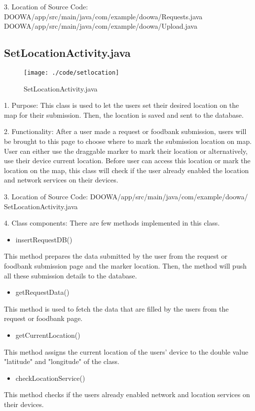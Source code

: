 \documentclass[conference]{IEEEtran}
\begin{document}
3. Location of Source Code: DOOWA/app/src/main/java/com/example/doowa/Requests.java\\
 DOOWA/app/src/main/java/com/example/doowa/Upload.java
\break
\break
\subsection{SetLocationActivity.java}
\begin{figure}[h!]
\texttt{[image: ./code/setlocation]}
\centering
\caption{SetLocationActivity.java}
\end{figure}
1. Purpose: This class is used to let the users set their desired location on the map for their submission. Then, the location is saved and sent to the database.\break
\par 2. Functionality: After a user made a request or foodbank submission, users will be brought to this page to choose where to mark the submission location on map. User can either use the draggable marker to mark their location or alternatively, use their device current location. Before user can access this location or mark the location on the map, this class will check if the user already enabled the location and network services on their devices. \break

3. Location of Source Code: DOOWA/app/src/main/java/com/example/doowa/ SetLocationActivity.java\break

4. Class components: There are few methods implemented in this class.
\begin{itemize}
\item insertRequestDB()
\end{itemize}
This method prepares the data submitted by the user from the request or foodbank submission page and the marker location. Then, the method will push all these submission details to the database. 
\begin{itemize}
\item  getRequestData()
\end{itemize}
This method is used to fetch the data that are filled by the users from the request or foodbank page.
\begin{itemize}
\item getCurrentLocation()
\end{itemize}
This method assigns the current location of the users' device to the double value "latitude" and "longitude" of the class.
\begin{itemize}
\item checkLocationService()
\end{itemize}
This method checks if the users already enabled network and location services on their devices.
\break
\end{document}

